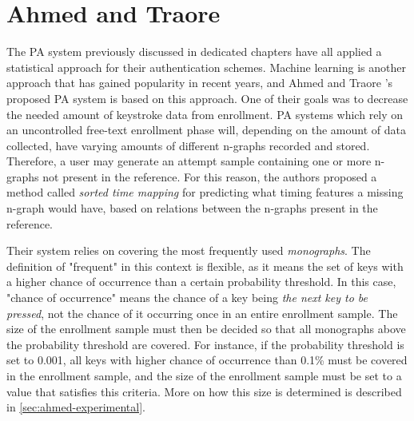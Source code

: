 \documentclass[informationsecurity]{gucmasterproject}
\begin{document}
\chapter{Ahmed and Traore}
\label{chap:ahmed}

The PA system previously discussed in dedicated chapters have all applied a statistical approach for their authentication schemes.
Machine learning is another approach that has gained popularity in recent years, and Ahmed and Traore \cite{Ahmed}'s proposed PA system is based on this approach.
One of their goals was to decrease the needed amount of keystroke data from enrollment.
PA systems which rely on an uncontrolled free-text enrollment phase will, depending on the amount of data collected, have varying amounts of different n-graphs recorded and stored.
Therefore, a user may generate an attempt sample containing one or more n-graphs not present in the reference.
For this reason, the authors proposed a method called \textit{sorted time mapping} for predicting what timing features a missing n-graph would have, based on relations between the n-graphs present in the reference.

Their system relies on covering the most frequently used \textit{monographs}.
The definition of "frequent" in this context is flexible, as it means the set of keys with a higher chance of occurrence than a certain probability threshold.
In this case, "chance of occurrence" means the chance of a key being \textit{the next key to be pressed}, not the chance of it occurring once in an entire enrollment sample.
The size of the enrollment sample must then be decided so that all monographs above the probability threshold are covered.
For instance, if the probability threshold is set to 0.001, all keys with higher chance of occurrence than 0.1\% must be covered in the enrollment sample, and the size of the enrollment sample must be set to a value that satisfies this criteria.
More on how this size is determined is described in \cref{sec:ahmed-experimental}.
\end{document}
